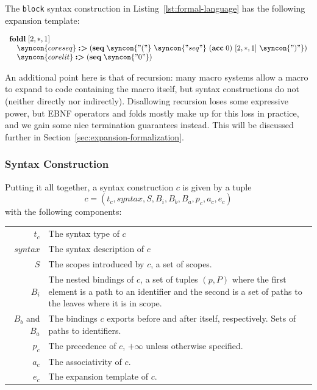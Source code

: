 \documentclass{kththesis}
\begin{document}
The \texttt{block} syntax construction in Listing~\ref{lst:formal-language} has the following expansion template:

$$
\begin{array}{l}
\foldl [2, *, 1] \\
\quad \syncon{coreseq} \tagged (\seq \syncon{"("}\ \syncon{"seq"}\ (\acc 0)\ [2, *, 1]\ \syncon{")"}) \\
\quad \syncon{corelit} \tagged (\seq \syncon{"0"}) \\
\end{array}
$$

An additional point here is that of recursion: many macro systems allow a macro to expand to code containing the macro itself, but syntax constructions do not (neither directly nor indirectly). Disallowing recursion loses some expressive power, but EBNF operators and folds mostly make up for this loss in practice, and we gain some nice termination guarantees instead. This will be discussed further in Section~\ref{sec:expansion-formalization}.

\subsubsection{Syntax Construction}

Putting it all together, a syntax construction $c$ is given by a tuple
$$ c = (t_c, syntax, S, B_i, B_b, B_a, p_c, a_c, e_c) $$
with the following components:

\begin{tabular}{r|p{10cm}}
$t_c$ & The syntax type of $c$ \\
$syntax$ & The syntax description of $c$ \\
$S$ & The scopes introduced by $c$, a set of scopes. \\
$B_i$ & The nested bindings of $c$, a set of tuples $(p, P)$ where the first element is a path to an identifier and the second is a set of paths to the leaves where it is in scope. \\
$B_b$ and $B_a$ & The bindings $c$ exports before and after itself, respectively. Sets of paths to identifiers. \\
$p_c$ & The precedence of $c$, $+\infty$ unless otherwise specified. \\
$a_c$ & The associativity of $c$. \\
$e_c$ & The expansion template of $c$. \\
\end{tabular}
\end{document}
